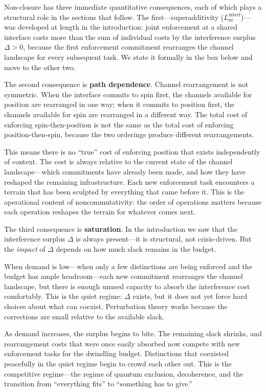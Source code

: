 \documentclass[11pt]{article}
\begin{document}
Non-closure has three immediate quantitative consequences, each of which plays a structural role in the sections that follow.  The first---superadditivity ($L_{\mathrm{nc}}^{\mathrm{interf}}$)---was developed at length in the introduction: joint enforcement at a shared interface costs more than the sum of individual costs by the interference surplus $\Delta > 0$, because the first enforcement commitment rearranges the channel landscape for every subsequent task.  We state it formally in the box below and move to the other two.

The second consequence is \textbf{path dependence}.  Channel rearrangement is not symmetric.  When the interface commits to spin first, the channels available for position are rearranged in one way; when it commits to position first, the channels available for spin are rearranged in a different way.  The total cost of enforcing spin-then-position is not the same as the total cost of enforcing position-then-spin, because the two orderings produce different rearrangements.

This means there is no ``true'' cost of enforcing position that exists independently of context.  The cost is always relative to the current state of the channel landscape---which commitments have already been made, and how they have reshaped the remaining infrastructure.  Each new enforcement task encounters a terrain that has been sculpted by everything that came before it.  This is the operational content of noncommutativity: the order of operations matters because each operation reshapes the terrain for whatever comes next.

The third consequence is \textbf{saturation}.  In the introduction we saw that the interference surplus $\Delta$ is always present---it is structural, not crisis-driven.  But the \emph{impact} of $\Delta$ depends on how much slack remains in the budget.

When demand is low---when only a few distinctions are being enforced and the budget has ample headroom---each new commitment rearranges the channel landscape, but there is enough unused capacity to absorb the interference cost comfortably.  This is the quiet regime: $\Delta$ exists, but it does not yet force hard choices about what can coexist.  Perturbation theory works because the corrections are small relative to the available slack.

As demand increases, the surplus begins to bite.  The remaining slack shrinks, and rearrangement costs that were once easily absorbed now compete with new enforcement tasks for the dwindling budget.  Distinctions that coexisted peacefully in the quiet regime begin to crowd each other out.  This is the competitive regime---the regime of quantum exclusion, decoherence, and the transition from ``everything fits'' to ``something has to give.''
\end{document}
